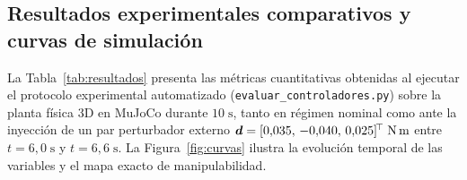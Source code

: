 \documentclass[11pt,a4paper]{article}
\newcommand{\T}{^{\!\top}}
\begin{document}
\subsection{Resultados experimentales comparativos y curvas de simulación}
\label{sec:results}

La Tabla~\ref{tab:resultados} presenta las métricas cuantitativas obtenidas al ejecutar el protocolo experimental automatizado (\texttt{evaluar\_controladores.py}) sobre la planta física 3D en MuJoCo durante $10\;\text{s}$, tanto en régimen nominal como ante la inyección de un par perturbador externo $\bm{d}=[0{,}035,\,-0{,}040,\,0{,}025]\T\;\text{N\,m}$ entre $t=6{,}0\;\text{s}$ y $t=6{,}6\;\text{s}$. La Figura~\ref{fig:curvas} ilustra la evolución temporal de las variables y el mapa exacto de manipulabilidad.
\end{document}

